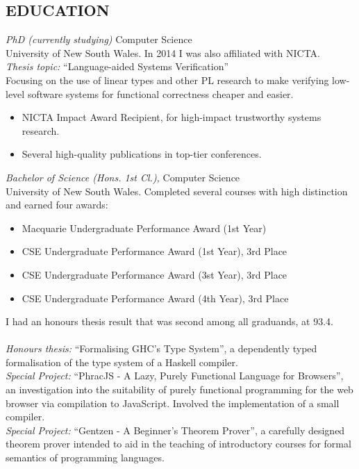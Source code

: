 \documentclass[line,margin]{res}
\begin{document}
\begin{resume}
\section{EDUCATION} 
                {\sl PhD (currently studying)} Computer Science\\
                University of New South Wales. In 2014 I was also affiliated
                with NICTA.
                \\ 
                \emph{Thesis topic:} ``Language-aided Systems Verification'' \\
                Focusing on the use of linear types and other PL research to
                make verifying low-level software systems for functional
                correctness cheaper and easier.
                \\
                \begin{itemize} \itemsep -2pt %
                    \item NICTA Impact Award Recipient, for high-impact trustworthy systems research.
                    \item Several high-quality publications in top-tier conferences.
                \end{itemize}

                {\sl Bachelor of Science (Hons. 1st Cl.),} Computer Science\\
                University of New South Wales. Completed several courses with high distinction
                and earned four awards:
                \begin{itemize} \itemsep -2pt %
                    \item Macquarie Undergraduate Performance Award (1st Year)
                    \item CSE Undergraduate Performance Award (1st Year), 3rd Place
                    \item CSE Undergraduate Performance Award (3st Year), 3rd Place
                    \item CSE Undergraduate Performance Award (4th Year), 3rd Place
                \end{itemize}
                I had an honours thesis result that was second among all graduands, at 93.4.
                \\
                \\ 
                \emph{Honours thesis:} ``Formalising GHC's Type System'', a dependently typed formalisation
                of the type system of a Haskell compiler.\\
                \emph{Special Project:} ``PhracJS - A Lazy, Purely Functional Language for Browsers'', an investigation into the suitability of purely functional programming for the web browser via compilation to JavaScript.
Involved the implementation of a small compiler.          \\
                \emph{Special Project:} ``Gentzen - A Beginner's Theorem Prover'', a carefully designed theorem prover intended to aid in the teaching of introductory courses for formal semantics of programming languages.
 

\end{resume}
\end{document}
